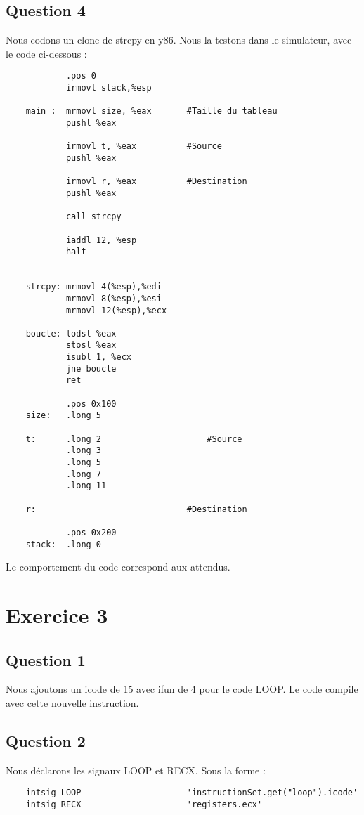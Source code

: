 \documentclass[a4paper,10pt]{article}
\begin{document}
\subsection{Question 4}
Nous codons un clone de strcpy en y86. Nous la testons dans le simulateur, avec le code ci-dessous :
\begin{verbatim}
            .pos 0
            irmovl stack,%esp

    main :  mrmovl size, %eax       #Taille du tableau
            pushl %eax

            irmovl t, %eax          #Source
            pushl %eax

            irmovl r, %eax          #Destination
            pushl %eax

            call strcpy

            iaddl 12, %esp
            halt


    strcpy: mrmovl 4(%esp),%edi
            mrmovl 8(%esp),%esi
            mrmovl 12(%esp),%ecx

    boucle: lodsl %eax
            stosl %eax
            isubl 1, %ecx
            jne boucle
            ret

            .pos 0x100
    size:   .long 5

    t:      .long 2                     #Source
            .long 3
            .long 5
            .long 7
            .long 11

    r:                              #Destination

            .pos 0x200
    stack:  .long 0

\end{verbatim}
Le comportement du code correspond aux attendus.

\section{Exercice 3}
\subsection{Question 1}
Nous ajoutons un icode de 15 avec ifun de 4 pour le code LOOP. Le code compile avec cette nouvelle instruction.

\subsection{Question 2}
Nous déclarons les signaux LOOP et RECX. Sous la forme :
\begin{verbatim}
    intsig LOOP                     'instructionSet.get("loop").icode'
    intsig RECX                     'registers.ecx'
\end{verbatim}
\end{document}
